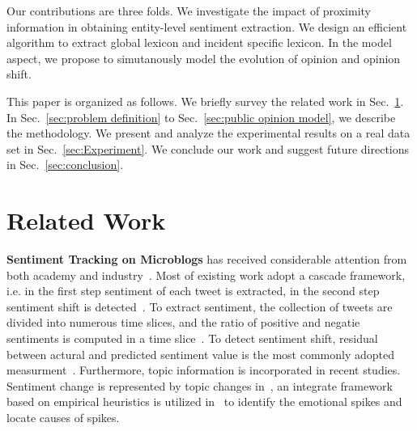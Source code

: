 \documentclass[runningheads]{llncs}
\begin{document}
Our contributions are three folds. 
We investigate the impact of proximity information in obtaining entity-level sentiment extraction.
We design an efficient algorithm to extract global lexicon and incident specific lexicon.
In the model aspect, we propose to simutanously model the evolution of opinion and opinion shift.

This paper is organized as follows. We briefly survey the related work in Sec.~\ref{sec:related}. In Sec.~\ref{sec:problem definition} to Sec.~\ref{sec:public opinion model}, we describe the methodology. We present and analyze the experimental results on a real data set in Sec.~\ref{sec:Experiment}. We conclude our work and suggest future directions in Sec.~\ref{sec:conclusion}.
\section{Related Work}\label{sec:related}
\textbf{Sentiment Tracking on Microblogs} has received considerable attention from both academy and industry~\cite{Giachanou2016sentichange,Giachanou2017sentichange,Giachanou2016sentitime,An2014sentimentchange,Bollen2011sentimentchange,Tan2014topic,Montero2016sentimentchange}. Most of existing work adopt a cascade framework, i.e. in the first step sentiment of each tweet is extracted, in the second step sentiment shift is detected~\cite{Giachanou2016sentichange,Giachanou2017sentichange,Giachanou2016sentitime,An2014sentimentchange,Bollen2011sentimentchange,Tan2014topic}. To extract sentiment, the collection of tweets are divided into numerous time slices, and the ratio of positive and negatie sentiments is computed in a time slice~\cite{Giachanou2017sentichange,Giachanou2016sentitime,An2014sentimentchange,Bollen2011sentimentchange}. 
To detect sentiment shift, residual between actural and predicted sentiment value is the most commonly adopted measurment~\cite{Giachanou2016sentichange,Giachanou2016sentitime}. 
Furthermore, topic information is incorporated in recent studies. Sentiment change is represented by topic changes in~\cite{Tan2014topic}, an integrate framework based on empirical heuristics is utilized in~\cite{Montero2016sentimentchange} to identify
the emotional spikes and locate causes of spikes.%
\end{document}
